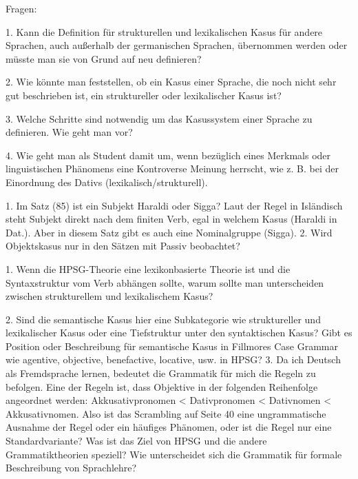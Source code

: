 


%



\appendix










Fragen:

1. Kann die Definition für strukturellen und lexikalischen Kasus für andere Sprachen, auch außerhalb der germanischen Sprachen, übernommen werden oder müsste man sie von Grund auf neu definieren? 

2. Wie könnte man feststellen, ob ein Kasus einer Sprache, die noch nicht sehr gut beschrieben ist, ein struktureller oder lexikalischer Kasus ist? 

3. Welche Schritte sind notwendig um das Kasussystem einer Sprache zu definieren. Wie geht man vor? 

4. Wie geht man als Student damit um, wenn bezüglich eines Merkmals oder linguistischen Phänomens eine Kontroverse Meinung herrscht, wie z. B. bei der Einordnung des Dativs (lexikalisch/strukturell).




1.	Im Satz (85) ist ein Subjekt Haraldi oder Sigga?
Laut der Regel in Isländisch steht Subjekt direkt nach dem finiten Verb, egal in welchem Kasus (Haraldi in Dat.). Aber in diesem Satz gibt es auch eine Nominalgruppe  (Sigga).
2.	Wird Objektskasus nur in den Sätzen mit Passiv beobachtet?
  



1. Wenn die HPSG-Theorie eine lexikonbasierte Theorie ist und die
Syntaxstruktur vom Verb abhängen sollte, warum sollte man unterscheiden
zwischen strukturellem und lexikalischem Kasus?

2. Sind die semantische Kasus hier eine Subkategorie wie struktureller und
lexikalischer Kasus oder eine Tiefstruktur unter den syntaktischen Kasus?
Gibt es Position oder Beschreibung für semantische Kasus in Fillmores Case
Grammar wie agentive, objective, benefactive, locative, usw. in HPSG? 3.
Da ich Deutsch als Fremdsprache lernen, bedeutet die Grammatik für mich
die Regeln zu befolgen. Eine der Regeln ist, dass Objektive in der
folgenden Reihenfolge angeordnet werden: Akkusativpronomen < Dativpronomen
< Dativnomen < Akkusativnomen.
Also ist das Scrambling auf Seite 40 eine ungrammatische Ausnahme der
Regel oder ein häufiges Phänomen, oder ist die Regel nur eine
Standardvariante? Was ist das Ziel von HPSG und die andere
Grammatiktheorien speziell? Wie unterscheidet sich die Grammatik für
formale Beschreibung von Sprachlehre?

